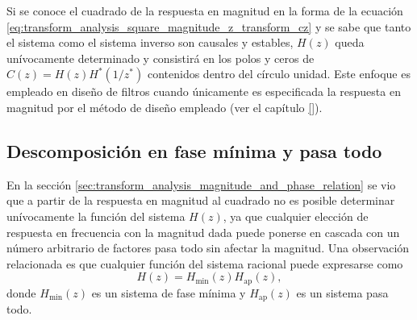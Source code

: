 \documentclass[a4paper]{report}
\begin{document}
Si se conoce el cuadrado de la respuesta en magnitud en la forma de la ecuación \ref{eq:transform_analysis_square_magnitude_z_transform_cz} y se sabe que tanto el sistema como el sistema inverso son causales y estables, \(H(z)\) queda unívocamente determinado y consistirá en los polos y ceros de \(C(z)=H(z)H^*(1/z^*)\) contenidos dentro del círculo unidad. Este enfoque es empleado en diseño de filtros cuando únicamente es especificada la respuesta en magnitud por el método de diseño empleado (ver el capítulo \ref{}).

\subsection{Descomposición en fase mínima y pasa todo}\label{sec:transform_analysis_min_phase_all_pass_decomposition}

En la sección \ref{sec:transform_analysis_magnitude_and_phase_relation} se vio que a partir de la respuesta en magnitud al cuadrado no es posible determinar unívocamente la función del sistema \(H(z)\), ya que cualquier elección de respuesta en frecuencia con la magnitud dada puede ponerse en cascada con un número arbitrario de factores pasa todo sin afectar la magnitud. Una observación relacionada es que cualquier función del sistema racional puede expresarse como
\begin{equation}\label{eq:transform_analysis_min_phase_all_pass_decomposition}
 H(z)=H_\textrm{min}(z)H_\textrm{ap}(z), 
\end{equation}
donde \(H_\textrm{min}(z)\) es un sistema de fase mínima y \(H_\textrm{ap}(z)\) es un sistema pasa todo.
\end{document}
